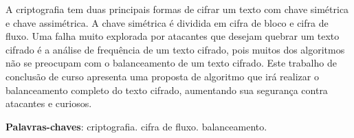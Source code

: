 \begin{resumo}
A criptografia tem  duas principais formas de cifrar um texto com chave simétrica e chave assimétrica. A chave simétrica é dividida em cifra de bloco e cifra de fluxo. Uma falha muito explorada por atacantes que desejam quebrar um texto cifrado é a análise de frequência de um texto cifrado, pois muitos dos algoritmos não se preocupam com o balanceamento de um texto cifrado. Este trabalho de conclusão de curso apresenta uma proposta de algoritmo que irá realizar o balanceamento completo do texto cifrado, aumentando sua segurança contra atacantes e curiosos.

 \vspace{\onelineskip}
    
 \noindent
 \textbf{Palavras-chaves}: criptografia. cifra de fluxo. balanceamento.
\end{resumo}
